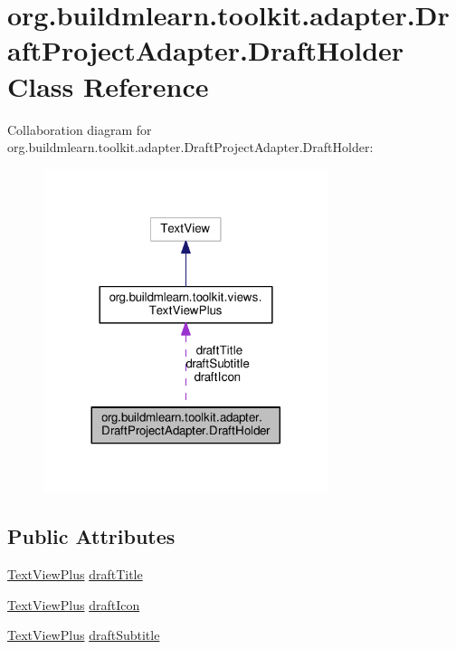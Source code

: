 \hypertarget{classorg_1_1buildmlearn_1_1toolkit_1_1adapter_1_1DraftProjectAdapter_1_1DraftHolder}{}\section{org.\+buildmlearn.\+toolkit.\+adapter.\+Draft\+Project\+Adapter.\+Draft\+Holder Class Reference}
\label{classorg_1_1buildmlearn_1_1toolkit_1_1adapter_1_1DraftProjectAdapter_1_1DraftHolder}


Collaboration diagram for org.\+buildmlearn.\+toolkit.\+adapter.\+Draft\+Project\+Adapter.\+Draft\+Holder\+:
\nopagebreak
\begin{figure}[H]
\begin{center}
\leavevmode
\includegraphics[width=236pt]{classorg_1_1buildmlearn_1_1toolkit_1_1adapter_1_1DraftProjectAdapter_1_1DraftHolder__coll__graph}
\end{center}
\end{figure}
\subsection*{Public Attributes}
\begin{DoxyCompactItemize}
\item 
\hyperlink{classorg_1_1buildmlearn_1_1toolkit_1_1views_1_1TextViewPlus}{Text\+View\+Plus} \hyperlink{classorg_1_1buildmlearn_1_1toolkit_1_1adapter_1_1DraftProjectAdapter_1_1DraftHolder_ade3eab0f132e524ac8987eb1233dfdb1}{draft\+Title}
\item 
\hyperlink{classorg_1_1buildmlearn_1_1toolkit_1_1views_1_1TextViewPlus}{Text\+View\+Plus} \hyperlink{classorg_1_1buildmlearn_1_1toolkit_1_1adapter_1_1DraftProjectAdapter_1_1DraftHolder_a17a9c862dfb634da8b67619233a1fc1e}{draft\+Icon}
\item 
\hyperlink{classorg_1_1buildmlearn_1_1toolkit_1_1views_1_1TextViewPlus}{Text\+View\+Plus} \hyperlink{classorg_1_1buildmlearn_1_1toolkit_1_1adapter_1_1DraftProjectAdapter_1_1DraftHolder_a2d131162611e8b26a739fc9739d2b0d9}{draft\+Subtitle}
\end{DoxyCompactItemize}


